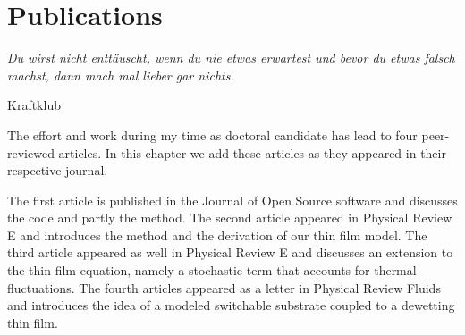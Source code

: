 \chapter{Publications}
\label{chapter:fourth_paper}
\epigraph{\textit{Du wirst nicht enttäuscht, wenn du nie etwas erwartest und bevor du etwas falsch machst, dann mach mal lieber gar nichts.}}{Kraftklub}

The effort and work during my time as doctoral candidate has lead to four peer-reviewed articles.
In this chapter we add these articles as they appeared in their respective journal. 

The first article is published in the Journal of Open Source software and discusses the code and partly the method.
The second article appeared in Physical Review E and introduces the method and the derivation of our thin film model.
The third article appeared as well in Physical Review E and discusses an extension to the thin film equation, namely a stochastic term that accounts for thermal fluctuations.
The fourth articles appeared as a letter in Physical Review Fluids and introduces the idea of a modeled switchable substrate coupled to a dewetting thin film. 